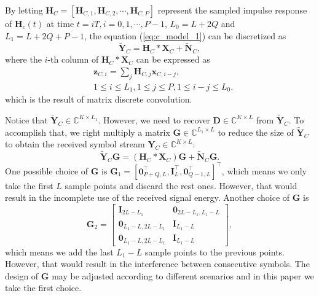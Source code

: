 \documentclass[lettersize,journal]{IEEEtran}
\newcommand{\nocolor}[1]{{\color{black}#1}}
\begin{document}
By letting $\mathbf{H}_C=[\mathbf{H}_{C,1},\mathbf{H}_{C,2},\cdots,\mathbf{H}_{C,P}]$ represent the sampled impulse response of $\mathbf{H}_c(t)$ at time $t=iT,i=0,1,\cdots,P-1$, $L_0=L+2Q$ and $L_1=L+2Q+P-1$, the equation (\ref{eq:c_model_1}) can be discretized as 
\begin{equation}
\label{eq:c_model_2}
    \widetilde{\mathbf{Y}}_C = \mathbf{H}_C*\mathbf{X}_C + \widetilde{\mathbf{N}}_C,
\end{equation}
where the $i$-th column of $\mathbf{H}_C*\mathbf{X}_C$ can be expressed as
\begin{equation}
\begin{aligned}
    &\mathbf{z}_{C,i} = \sum_j \mathbf{H}_{C,j}\mathbf{x}_{C,i-j}, \\
    &1\leq i\leq L_1,1\leq j\leq P,1\leq i-j\leq L_0.
\end{aligned}
\end{equation}
which is the result of matrix discrete convolution.

Notice that $\widetilde{\mathbf{Y}}_C\in\mathbb{C}^{K\times L_1}$. However, we need to recover $\mathbf{D}\in\mathbb{C}^{K\times L}$ from $\widetilde{\mathbf{Y}}_C$. To accomplish that, we right multiply a matrix $\mathbf{G}\in\mathbb{C}^{L_1\times L}$ to reduce the size of $\widetilde{\mathbf{Y}}_C$ to obtain the received symbol stream $\mathbf{Y}_C\in\mathbb{C}^{K\times L}$:
\begin{equation}
\label{eq:c_model_3}
    \widetilde{\mathbf{Y}}_C\mathbf{G} = (\mathbf{H}_C*\mathbf{X}_C)\mathbf{G} + \widetilde{\mathbf{N}}_C\mathbf{G}.
\end{equation}
One possible choice of $\mathbf{G}$ is $\mathbf{G}_1=[\mathbf{0}_{P+Q,L}^{\top},\mathbf{I}_L^{\top},\mathbf{0}_{Q-1,L}^{\top}]^{\top}$, which means we only take the first $L$ sample points and discard the rest ones. However, that would result in the incomplete use of the received signal energy. Another choice of $\mathbf{G}$ is 
\begin{equation}
    \mathbf{G}_2 =
    \begin{bmatrix}
        \mathbf{I}_{2L-L_1} & \mathbf{0}_{2L-L_1,L_1-L} \\
        \mathbf{0}_{L_1-L,2L-L_1} & \mathbf{I}_{L_1-L} \\
        \mathbf{0}_{L_1-L,2L-L_1} & \mathbf{I}_{L_1-L}
    \end{bmatrix},
\end{equation}
which means we add the last $L_1-L$ sample points to the previous points. However, that would result in the interference between \nocolor{consecutive symbols}. The design of $\mathbf{G}$ may be adjusted according to different scenarios and in this paper we take the first choice.
\end{document}

